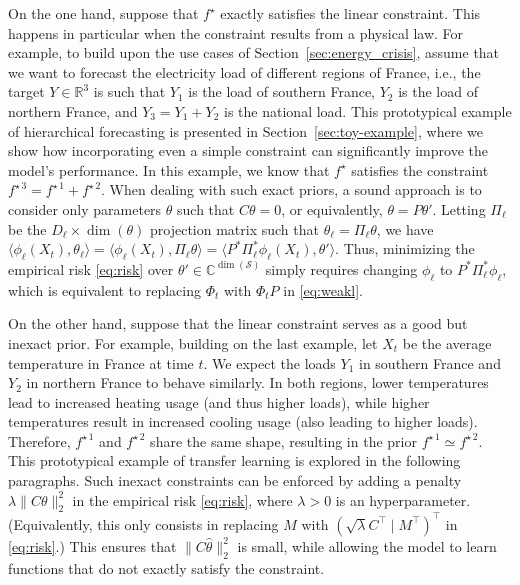 On the one hand, suppose that $f^\star$ exactly satisfies the linear constraint.
This happens in particular when the constraint results from a physical law. 
For example, to build upon the use cases of Section~\ref{sec:energy_crisis}, assume that we want to forecast the electricity load of different regions of France, i.e., the target $Y \in \mathbb R^3$ is such that $Y_1$ is the load of southern France, $Y_2$ is the load of northern France, and $Y_3 = Y_1+Y_2$ is the national load. 
This prototypical example of hierarchical forecasting is presented in Section~\ref{sec:toy-example}, where we show how incorporating even a simple constraint can significantly improve the model's performance. In this example, we know that $f^\star$ satisfies the constraint $f^{\star\,3} = f^{\star\,1} + f^{\star\,2}$.
When dealing with such exact priors, a sound approach is to consider only parameters $\theta$ such that $C\theta = 0$, or equivalently, $\theta = P\theta'$. Letting $\Pi_\ell$ be the $D_\ell\times \dim(\theta)$ projection matrix such that $\theta_\ell = \Pi_\ell \theta$, we have $\langle \phi_\ell (X_t), \theta_\ell\rangle = \langle \phi_\ell (X_t), \Pi_\ell \theta\rangle  = \langle P^\ast \Pi_\ell^\ast \phi_\ell (X_t),  \theta'\rangle$. 
Thus, minimizing the empirical risk \eqref{eq:risk} over $\theta' \in \mathbb C^{\dim(\mathcal S)}$ simply requires changing $\phi_\ell$ to $P^\ast \Pi_\ell^\ast \phi_\ell$, which is equivalent to replacing $\mathbb{\Phi}_t$ with $\mathbb{\Phi}_t P$ in \eqref{eq:weakl}. 

On the other hand, suppose that the linear constraint serves as a good but inexact prior. 
For example, building on the last example, let $X_t$ be the average temperature in France at time $t$. We expect the loads $Y_1$ in southern France and $Y_2$ in northern France to behave similarly. 
In both regions, lower temperatures lead to increased heating usage (and thus higher loads), while higher temperatures result in increased cooling usage (also leading to higher loads). 
Therefore, $f^{\star\,1}$ and $f^{\star\,2}$ share the same shape, resulting in the prior $f^{\star\,1} \simeq f^{\star\,2}$. 
This prototypical example of transfer learning is explored in the following paragraphs. Such inexact constraints can be enforced by adding a penalty $\lambda \|C\theta\|_2^2$ in the empirical risk \eqref{eq:risk}, where $\lambda > 0$ is an hyperparameter. (Equivalently, this only consists in replacing $M$ with $(\sqrt{\lambda} C^\top \mid  M^\top)^\top$ in \eqref{eq:risk}.)
This ensures that $\|C\hat \theta\|_2^2$ is small, while allowing the model to learn functions that do not exactly satisfy the constraint. 

